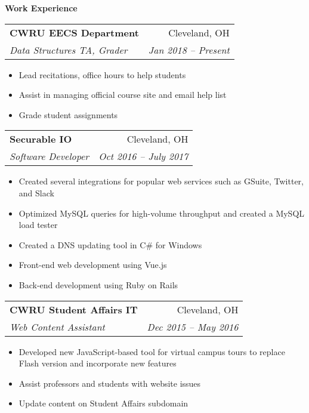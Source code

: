 \documentclass[letterpaper,11pt]{article}
\makeatletter
\newcommand{\resitem}[1]{\item #1}
\newcommand{\resheading}[1]{{\large \colorbox{shadingcolor}{\begin{minipage}{\textwidth}{\textbf{#1 \vphantom{p\^{E}}}}\end{minipage}}}}
\newcommand{\ressubheading}[4]{
\begin{tabular*}{\textwidth}{l@{\extracolsep{\fill}}r}
		\textbf{#1} & #2 \\
		\textit{#3} & \textit{#4} \\
\end{tabular*}\vspace{-6pt}}
\makeatother
\begin{document}
\vspace{0.1in}
%
%
\begin{minipage}{\linewidth}
\vfill\noindent
\begin{minipage}[t]{0.6\linewidth}
	\resheading{Work Experience}
	
	\vspace{0.1in}
	\ressubheading{CWRU EECS Department}{Cleveland, OH}{Data Structures TA, Grader}{Jan 2018 -- Present}
	\begin{itemize}[leftmargin=*,noitemsep]
		\resitem{Lead recitations, office hours to help students}
		\resitem{Assist in managing official course site and email help list}
		\resitem{Grade student assignments}
	\end{itemize}
	
	\ressubheading{Securable IO}{Cleveland, OH}{Software Developer}{Oct 2016 -- July 2017}
	\begin{itemize}[leftmargin=*,noitemsep]
		\resitem{Created several integrations for popular web services such as GSuite, Twitter, and Slack}
		\resitem{Optimized MySQL queries for high-volume throughput and created a MySQL load tester}
		\resitem{Created a DNS updating tool in C\# for Windows}
		\resitem{Front-end web development using Vue.js}
		\resitem{Back-end development using Ruby on Rails}
	\end{itemize}
	
	\ressubheading{CWRU Student Affairs IT}{Cleveland, OH}{Web Content Assistant}{Dec 2015 -- May 2016}
	\begin{itemize}[leftmargin=*,noitemsep]
		\resitem{Developed new JavaScript-based tool for virtual campus tours to replace Flash version and incorporate new features}
		\resitem{Assist professors and students with website issues}
		\resitem{Update content on Student Affairs subdomain}
	\end{itemize}
	

\end{minipage}
\end{minipage}
\end{document}
